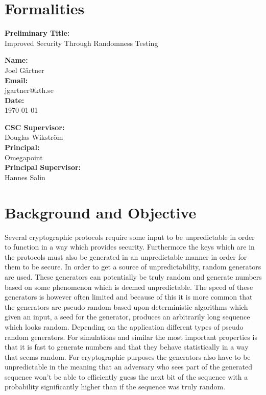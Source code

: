 \documentclass[a4paper,11pt]{report}
\begin{document}
\section*{Formalities}
\begin{center}
\textbf{Preliminary Title:}\\ Improved Security Through Randomness Testing
\end{center}

\begin{minipage}[t]{7cm}
\textbf{Name:}\\ Joel Gärtner\\
\textbf{Email:}\\ jgartner@kth.se\\
\textbf{Date:}\\ \today
\end{minipage}
\begin{minipage}[t]{7cm}
\textbf{CSC Supervisor:}\\ Douglas Wikström \\
\textbf{Principal:}\\
Omegapoint \\
\textbf{Principal Supervisor:}\\
 Hannes Salin\\
\end{minipage}
\section*{Background and Objective}
Several cryptographic protocols require some input to be unpredictable 
in order to function in a way which provides security. Furthermore the 
keys which are in the protocols must also be generated in an unpredictable
manner in order for them to be secure. In order to get a source of 
unpredictability, random generators are used. These generators can potentially 
be truly random and generate numbers based on some phenomenon which is deemed 
unpredictable. The speed of these generators is however often limited and because
of this it is more common that the generators are pseudo random 
based upon deterministic algorithms which given an input, 
a seed for the generator, produces an arbitrarily long sequence which 
looks random. Depending on the application different types of pseudo 
random generators. For simulations and similar the most important properties 
is that it is fast to generate numbers and that they behave statistically
in a way that seems random. For cryptographic purposes the generators 
also have to be unpredictable in the meaning that an adversary who sees part
of the generated sequence won't be able to efficiently guess the next bit 
of the sequence with a probability significantly higher than if the sequence 
was truly random. \\
\end{document}
